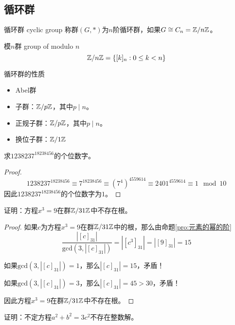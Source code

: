 \subsection{循环群}

\begin{definition}{循环群 cyclic group}
	称群$(G,*)$为$n$阶循环群，如果$G\cong C_n=\mathbb{Z}/n\mathbb{Z}$。
\end{definition}

\begin{definition}{模$n$群 group of modulo $n$}
	$$
	\mathbb{Z}/n\mathbb{Z}=\{ [k]_n:0\le k<n \}
	$$
\end{definition}

\begin{proposition}{循环群的性质}
	\begin{itemize}
		\item Abel群
		\item 子群：$\mathbb{Z}/p\mathbb{Z}$，其中$p\mid n$。
		\item 正规子群：$\mathbb{Z}/p\mathbb{Z}$，其中$p\mid n$。
		\item 换位子群：$\mathbb{Z}/1\mathbb{Z}$
	\end{itemize}
\end{proposition}

\begin{example}
	求$1238237^{18238456}$的个位数字。
\end{example}

\begin{proof}
	$$
	1238237^{18238456}\equiv 7^{18238456}\equiv(7^4)^{4559614}\equiv2401^{4559614}\equiv1\mod 10
	$$
	因此$1238237^{18238456}$的个位数字为$1$。
\end{proof}

\begin{example}
	证明：方程$x^3=9$在群$\mathbb{Z}/31\mathbb{Z}$中不存在根。
\end{example}

\begin{proof}
	如果$c$为方程$x^3=9$在群$\mathbb{Z}/31\mathbb{Z}$中的根，那么由命题\ref{pro:元素的幂的阶}
	$$
	\frac{|[c]_{31}|}{\mathrm{gcd}(3,|[c]_{31}|)}=|[c^3]_{31}|=|[9]_{31}|=15
	$$
	
	如果$\mathrm{gcd}(3,|[c]_{31}|)=1$，那么$|[c]_{31}|=15$，矛盾！
	
	如果$\mathrm{gcd}(3,|[c]_{31}|)=3$，那么$|[c]_{31}|=45>30$，矛盾！
	
	因此方程$x^3=9$在群$\mathbb{Z}/31\mathbb{Z}$中不存在根。
\end{proof}

\begin{example}
	证明：不定方程$a^2+b^2=3c^2$不存在整数解。
\end{example}

